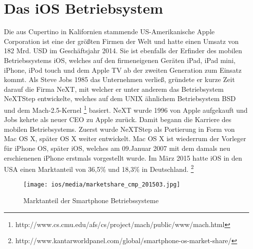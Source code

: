\section{Das iOS Betriebsystem}
	Die aus Cupertino in Kalifornien stammende US-Amerikanische Apple Corporation
	ist eine der größten Firmen der Welt und hatte einen Umsatz von 182 Mrd.
	USD im Geschäftsjahr 2014. Sie ist ebenfalls der Erfinder des mobilen
	Betriebssystems iOS, welches auf den firmeneigenen Geräten iPad, iPad mini,
	iPhone, iPod touch und dem Apple TV ab der zweiten Generation zum Einsatz
	kommt. Als Steve Jobs 1985 das Unternehmen verließ, gründete er
	kurze Zeit darauf die Firma NeXT, mit welcher er unter anderem das
	Betriebsystem NeXTStep entwickelte, welches auf dem UNIX ähnlichem
	Betriebsystem BSD\cite{Tanenbaum2009} und dem	Mach-2.5-Kernel
	\footnote{http://www.cs.cmu.edu/afs/cs/project/mach/public/www/mach.html}
	basiert. NeXT wurde 1996 von Apple aufgekauft und Jobs kehrte als neuer CEO zu
	Apple zurück. Damit begann die Karriere des mobilen Betriebsystems. Zuerst
	wurde NeXTStep als Portierung in Form von Mac OS X, später OS X weiter
	entwickelt. Mac OS X ist wiederrum der Vorleger für iPhone OS, später iOS,
	welches am 09.Januar 2007 mit dem damals neu erschienenen iPhone erstmals
	vorgestellt wurde. Im März 2015 hatte iOS in den USA einen Marktanteil von
	36,5\% und 18,3\% in Deutschland.
	\footnote{http://www.kantarworldpanel.com/global/smartphone-os-market-share/}\\
	
	\begin{figure}[h]
		\centering
		\texttt{[image: ios/media/marketshare\_cmp\_201503.jpg]}
		\caption{Marktanteil der Smartphone Betriebssysteme
		\cite{MobileOsStat}}
		\label{fig:marcetshare}
	\end{figure}